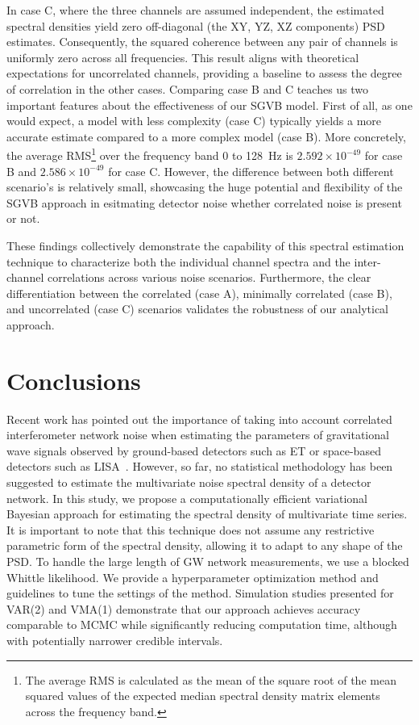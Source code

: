 \documentclass[%
 reprint,
 amsmath,amssymb,
 aps,
 nofootinbib,
]{revtex4-2}
\begin{document}
In case C, where the three channels are assumed independent, the estimated spectral densities yield zero off-diagonal (the XY, YZ, XZ components) PSD estimates.
Consequently, the squared coherence between any pair of channels is uniformly zero across all frequencies. 
This result aligns with theoretical expectations for uncorrelated channels,  providing a baseline to assess the degree of correlation in the other cases.
Comparing case B and C teaches us two important features about the effectiveness of our SGVB model. First of all, as one would expect, a model with less complexity (case C) typically yields a more accurate estimate compared to a more complex model (case B). More concretely, the average RMS\footnote{The average RMS is calculated as the mean of the square root of the mean squared values of the expected median spectral density matrix elements across the frequency band.
} over the frequency band 0 to \SI{128}{Hz}  is $2.592 \times 10^{-49}$ for case B and $2.586 \times 10^{-49}$ for case C. However, the difference between both different scenario's is relatively small, showcasing the huge potential and flexibility of the SGVB approach in esitmating detector noise whether correlated noise is present or not.


These findings collectively demonstrate the capability of this spectral estimation technique to characterize both the individual channel spectra and the inter-channel correlations across various noise scenarios.
Furthermore, the clear differentiation between the correlated (case A), minimally correlated (case B), and uncorrelated (case C) scenarios validates the robustness of our analytical approach.



\section{Conclusions}
\label{sec:Discussion}
Recent work has pointed out the importance of taking into account correlated interferometer network noise when estimating the parameters of gravitational wave signals observed by ground-based detectors such as ET or space-based detectors such as LISA~\cite{ET_design_report, Janssens2023, LISA_red_book}.
However, so far, no statistical methodology has been suggested to estimate the multivariate noise spectral density of a detector network.
In this study, we propose a computationally efficient variational Bayesian approach for estimating the spectral density of multivariate time series. 
It is important to note that this technique does not assume any restrictive parametric form of the spectral density, allowing it to adapt to any shape of the PSD.
To handle the large length of GW network measurements, we use a blocked Whittle likelihood. 
We provide a hyperparameter optimization method and guidelines to tune the settings of the method. 
Simulation studies presented for VAR(2) and VMA(1) demonstrate that our approach achieves accuracy comparable to MCMC while significantly reducing computation time, although with potentially narrower credible intervals.
\end{document}
